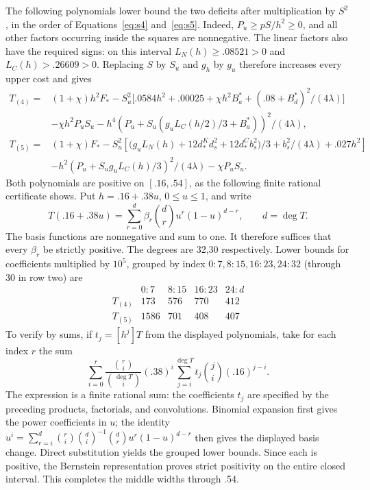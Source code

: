 The following polynomials lower bound the two deficits after multiplication
by $S^2$, in the order of Equations~\eqref{eq:s4} and~\eqref{eq:s5}.
Indeed, $P_u\ge pS/h^2\ge0$, and all other factors occurring inside
the squares are nonnegative. The linear factors also have the required
signs: on this interval $L_N(h)\ge.08521>0$ and
$L_C(h)>.26609>0$. Replacing $S$ by $S_u$ and $g_h$ by $g_u$
therefore increases every upper cost and gives
\[
\begin{aligned}
 T_{(4)}={}&(1+\chi)h^2F_*- S_u^2\big[.0584h^2+.00025+\chi h^2 B_a^*+(.08+B_d^*)^2/(4\lambda)\big]\\
          &-\chi h^2 P_u S_u-h^4(P_u+S_u(g_u L_C(h/2)/3+B_a^*))^2/(4\lambda),\\
 T_{(5)}={}&(1+\chi)F_*-
  S_u^2\left[\big(g_u L_N(h)+12d_*^K d_s^2+12d_*^C b_s^2\big)/3+b_s^2/(4\lambda)+.027h^2\right]\\
          &-h^2(P_u+S_u g_u L_C(h)/3)^2/(4\lambda)-\chi P_u S_u .
\end{aligned}
\]
Both polynomials are positive on $[.16,.54]$, as the following finite
rational certificate shows. Put $h=.16+.38u$, $0\le u\le1$, and write
\[
 T(.16+.38u)=\sum_{r=0}^{d}\beta_r\binom dr u^r(1-u)^{d-r},
 \qquad d=\deg T.
\]
The basis functions are nonnegative and sum to one. It therefore
suffices that every $\beta_r$ be strictly positive. The degrees are 32,30 respectively. Lower bounds for coefficients multiplied by \(10^5\), grouped by index \(0{:}7,8{:}15,16{:}23,24{:}32\) (through 30 in row two) are
\[
\begin{array}{c|rrrr}
 &0{:}7&8{:}15&16{:}23&24{:}d\\\hline
 T_{(4)}&173&576&770&412\\
T_{(5)}&1586&701&408&407
\end{array}
\]
To verify by sums, if \(t_j=[h^j]T\) from the displayed polynomials, take for each index \(r\) the sum
\[
 \sum_{i=0}^r\frac{\binom ri}{\binom{\deg T}i}(.38)^i
       \sum_{j=i}^{\deg T}t_j\binom ji(.16)^{j-i}.
\]
The expression is a finite rational sum: the coefficients $t_j$ are
specified by the preceding products, factorials, and convolutions.
Binomial expansion first gives the power coefficients in $u$; the identity
$u^i=\sum_{r=i}^d\binom ri\binom di^{-1}\binom dr u^r(1-u)^{d-r}$
then gives the displayed basis change. Direct substitution yields the
grouped lower bounds. Since each is positive, the Bernstein
representation proves strict positivity on the entire closed interval. This completes the middle widths through .54.

